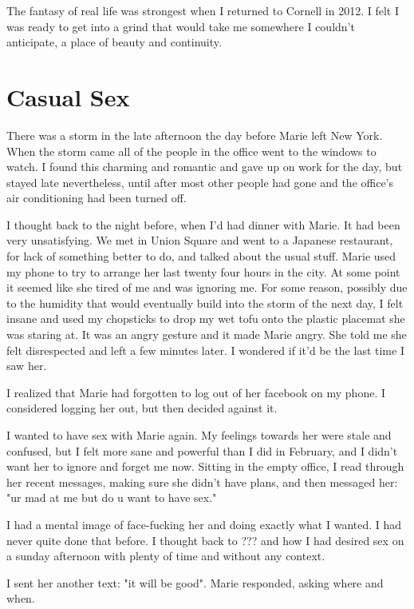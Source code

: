 \documentclass[12pt]{article}
\begin{document}
The fantasy of real life was strongest when I returned to Cornell in 2012.
I felt I was ready to get into a grind that would take me somewhere I couldn't
anticipate, a place of beauty and continuity.  

\section{Casual Sex}

There was a storm in the late afternoon the day before Marie left New York.
When the storm came all of the people in the office went to the windows to
watch.  I found this charming and romantic and gave up on work for the day, but
stayed late nevertheless, until after most other people had gone and the
office's air conditioning had been turned off.  

I thought back to the night before, when I'd had dinner with Marie.  It had been
very unsatisfying.  We met in Union Square and went to a Japanese restaurant,
for lack of something better to do, and talked about the usual stuff.  Marie
used my phone to try to arrange her last twenty four hours in the city.  At some
point it seemed like she tired of me and was ignoring me.  For some reason,
possibly due to the humidity that would eventually build into the storm of the
next day, I felt insane and used my chopsticks to drop my wet tofu onto the
plastic placemat she was staring at.  It was an angry gesture and it made Marie
angry.  She told me she felt disrespected and left a few minutes later.  I
wondered if it'd be the last time I saw her.

I realized that Marie had forgotten to log out of her facebook on my phone.  I
considered logging her out, but then decided against it.

I wanted to have sex with Marie again.  My feelings towards her were stale and
confused, but I felt more sane and powerful than I did in February, and I didn't
want her to ignore and forget me now.  Sitting in the empty office, I read
through her recent messages, making sure she didn't have plans, and then
messaged her: "ur mad at me but do u want to have sex."

I had a mental image of face-fucking her and doing exactly what I wanted.  I had
never quite done that before.  I thought back to ??? and how I had desired sex
on a sunday afternoon with plenty of time and without any context.  

I sent her another text: "it will be good".  Marie responded, asking where and
when.
\end{document}
